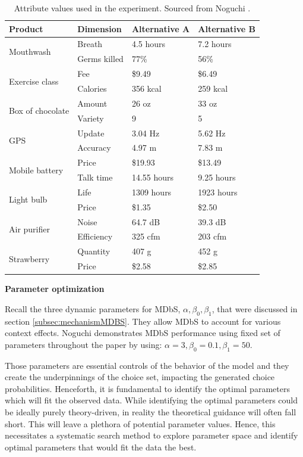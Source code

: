 \documentclass[a4paper,12pt]{article}
\newcommand{\citeyearonly}[1]{\citeyearpar{#1}}
\begin{document}
\begin{table}
\centering

\begin{tabular}{l|lll}
\hline
Product & Dimension & Alternative A & Alternative B \\
\hline
\multirow{2}{*}{Mouthwash} & Breath & 4.5 hours & 7.2 hours \\
 & Germs killed & 77\% & 56\% \\[2ex]
\multirow{2}{*}{Exercise class} & Fee & \$9.49 & \$6.49 \\
 & Calories & 356 kcal & 259 kcal \\[2ex]
\multirow{2}{*}{Box of chocolate} & Amount & 26 oz & 33 oz \\
 & Variety & 9 & 5 \\[2ex]
\multirow{2}{*}{GPS} & Update & 3.04 Hz & 5.62 Hz \\
 & Accuracy & 4.97 m & 7.83 m \\[2ex]
\multirow{2}{*}{Mobile battery} & Price & \$19.93 & \$13.49 \\
 & Talk time & 14.55 hours & 9.25 hours \\[2ex]
\multirow{2}{*}{Light bulb} & Life & 1309 hours & 1923 hours \\
 & Price & \$1.35 & \$2.50 \\[2ex]
\multirow{2}{*}{Air purifier} & Noise & 64.7 dB & 39.3 dB \\
 & Efficiency & 325 cfm & 203 cfm \\[2ex]
\multirow{2}{*}{Strawberry} & Quantity & 407 g & 452 g \\
 & Price & \$2.58 & \$2.85 \\
\hline
\end{tabular}
\caption[Attribute values used in experiment]{Attribute values used in the experiment. Sourced from Noguchi \citeyearonly{noguchi2018multialternative}.}
\label{tab:noguchiDescriptions}
\end{table}

\textbf{Parameter optimization}

Recall the three dynamic parameters for MDbS, $\alpha, \beta_0, \beta_1$, that were discussed in section \ref{subsec:mechanismMDBS}. They allow MDbS to account for various context effects. Noguchi \citeyearonly{noguchi2018multialternative} demonstrates MDbS performance using fixed set of parameters throughout the paper by using: $\alpha = 3, \beta_0 = 0.1, \beta_1 = 50$. 

Those parameters are essential controls of the behavior of the model and they create the underpinnings of the choice set, impacting the generated choice probabilities. Henceforth, it is fundamental to identify the optimal parameters which will fit the observed data. While identifying the optimal parameters could be ideally purely theory-driven, in reality the theoretical guidance will often fall short. This will leave a plethora of potential parameter values. Hence, this necessitates a systematic search method to explore parameter space and identify optimal parameters that would fit the data the best.
\end{document}
